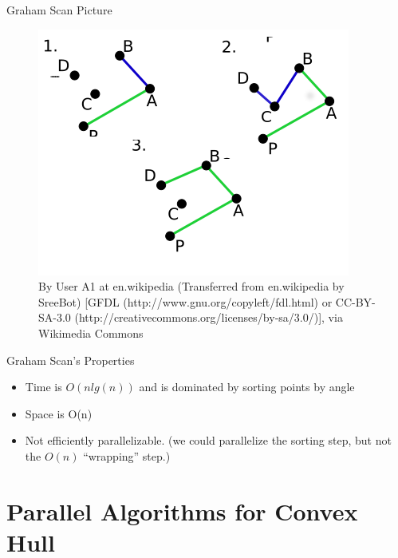 \documentclass{beamer}
\begin{document}
\begin{frame}{Graham Scan Picture}
\begin{figure}
\includegraphics[width=.2\linewidth,center]{imgs/Graham_Scan.png}
    \caption{By User A1 at en.wikipedia (Transferred from en.wikipedia by SreeBot) [GFDL (http://www.gnu.org/copyleft/fdl.html) or CC-BY-SA-3.0 (http://creativecommons.org/licenses/by-sa/3.0/)], via Wikimedia Commons}
\end{figure}

\end{frame}

\begin{frame}{Graham Scan's Properties}

\begin{itemize}
\item
	Time is $O(nlg(n))$ and is dominated by sorting points by angle
\item
	Space is O(n)
\item
	Not efficiently parallelizable. (we could parallelize the sorting step, but not the $O(n)$ ``wrapping'' step.)

\end{itemize}
\end{frame}





\section{Parallel Algorithms for Convex Hull}
\end{document}
